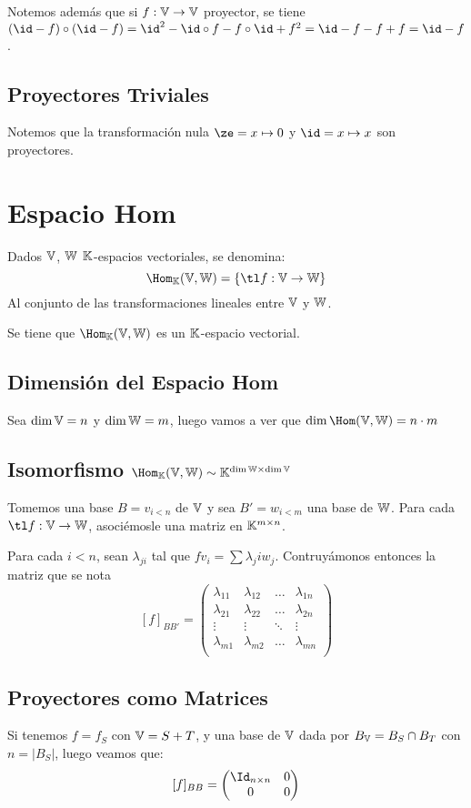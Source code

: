 \documentclass{article}
\begin{document}
Notemos además que si $f: \mathbb{V} \to \mathbb{V}$ proyector, se tiene $(\id - f) \circ (\id
- f) = \id^2 - \id \circ f - f \circ \id + f^2 = \id - f - f + f = \id - f$.

\subsection{Proyectores Triviales}
Notemos que la transformación nula $\ze = x\mapsto 0$ y $\id = x \mapsto x$ son
proyectores.

\section{Espacio Hom}
Dados $\mathbb{V}$, $\mathbb{W}$ $\mathbb{K}$-espacios vectoriales, se denomina:
\[\Hom_\K(\V, \W) = \{\tl f : \V \to \W\}\]
Al conjunto de las transformaciones lineales entre $\mathbb{V}$ y $\mathbb{W}$.

Se tiene que $\Hom_\K(\V, \W)$ es un $\mathbb{K}$-espacio vectorial.

\subsection{Dimensión del Espacio Hom}
Sea $\dim \mathbb{V} = n$ y $\dim \mathbb{W} = m$, luego vamos a ver que $\dim \Hom(\V, \W) = n
\cdot m$

\subsection{Isomorfismo $\Hom_\K(\V, \W) \sim \K^{\dim \W \times \dim \V}$}
Tomemos una base $B = v_{i < n}$ de $\mathbb{V}$ y sea $B' = w_{i < m}$ una base de $\mathbb{W}$.
Para cada $\tl f : \V \to \W$, asociémosle una matriz en $\mathbb{K}^{m \times n}$.

Para cada $i < n$, sean $\lambda_{ji}$ tal que $fv_i = \sum \lambda_ji w_j$.
Contruyámonos entonces la matriz que se nota \[ [f]_{BB'} = 
\begin{pmatrix}
	\lambda_{11} & \lambda_{12} & \dots & \lambda_{1n} \\
	\lambda_{21} & \lambda_{22} & \dots & \lambda_{2n} \\
	\vdots & \vdots & \ddots & \vdots \\
	\lambda_{m1} & \lambda_{m2} & \dots & \lambda_{mn} \\
\end{pmatrix}
\]

\subsection{Proyectores como Matrices}
Si tenemos $f = f_{S}$ con $\mathbb{V} = S + T$, y una base de $\mathbb{V}$ dada por $B_{\mathbb{V}} =
B_S \cap B_T$ con $n = |B_S|$, luego veamos que:
\[
	[f]_{BB} = 
	\begin{pmatrix}
		\Id_{n \times n} & 0 \\
		0 & 0 \\
	\end{pmatrix}
\]
\end{document}
